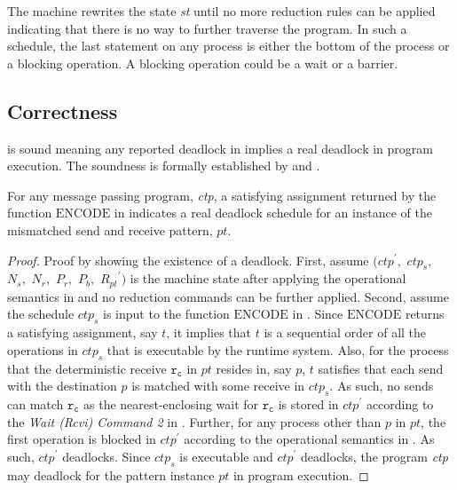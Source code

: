 The machine rewrites the state \textit{st} until no more reduction rules can be applied indicating that there is no way to further traverse the program. In such a schedule, the last statement on any process is either the bottom of the process or a blocking operation. A blocking operation could be a wait or a barrier. 

\subsection{Correctness}

 is sound meaning any reported deadlock in  implies a real deadlock in program execution. The soundness is formally established by  and .

\begin{lemma}
For any message passing program, \textit{ctp}, a satisfying assignment returned by the function $\mathrm{ENCODE}$ in  indicates a real deadlock schedule for an instance of the mismatched send and receive pattern, $\mathit{pt}$. 
\label{lemma:mismatch}
\end{lemma}
\begin{proof}
Proof by showing the existence of a deadlock. First, assume $(\mathit{ctp}^\prime,$ $\mathit{ctp}_s,$ $\mathit{N_s},$ $\mathit{N_r},$ $\mathit{P_r},$ $\mathit{P_b},$ $\mathit{R_{pt}}^\prime)$ is the machine state after applying the operational semantics in  and no reduction commands can be further applied. Second, assume the schedule $\mathit{ctp}_s$ is input to the function $\mathrm{ENCODE}$ in . Since $\mathrm{ENCODE}$ returns a satisfying assignment, say $\mathit{t}$, it implies that $\mathit{t}$ is a sequential order of all the operations in $\mathit{ctp}_s$ that is executable by the runtime system. Also, for the process that the deterministic receive $\mathtt{r_c}$ in $\mathit{pt}$ resides in, say $\mathit{p}$, $\mathit{t}$ satisfies that each send with the destination $\mathit{p}$ is matched with some receive in $\mathit{ctp}_s$. As such, no sends can match $\mathtt{r_c}$ as the nearest-enclosing wait for $\mathtt{r_c}$ is stored in $\mathit{ctp}^\prime$ according to the \emph{Wait (Rcvi) Command 2} in . Further, for any process other than $\mathit{p}$ in $\mathit{pt}$, the first operation is blocked in $\mathit{ctp}^\prime$ according to the operational semantics in . As such, $\mathit{ctp}^\prime$ deadlocks. Since $\mathit{ctp}_s$ is executable and $\mathit{ctp}^\prime$ deadlocks, the program \textit{ctp} may deadlock for the pattern instance $\mathit{pt}$ in program execution. 
\end{proof}

